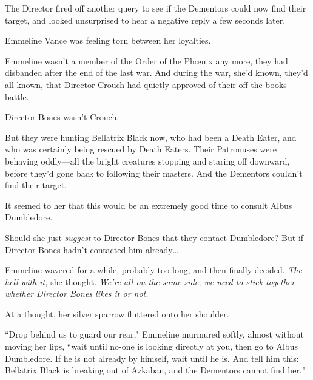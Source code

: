 The Director fired off another query to see if the Dementors could now find their target, and looked unsurprised to hear a negative reply a few seconds later.

Emmeline Vance was feeling torn between her loyalties.

Emmeline wasn't a member of the Order of the Phœnix any more, they had disbanded after the end of the last war. And during the war, she'd known, they'd all known, that Director Crouch had quietly approved of their off-the-books battle.

Director Bones wasn't Crouch.

But they were hunting Bellatrix Black now, who had been a Death Eater, and who was certainly being rescued by Death Eaters. Their Patronuses were behaving oddly—all the bright creatures stopping and staring off downward, before they'd gone back to following their masters. And the Dementors couldn't find their target.

It seemed to her that this would be an extremely good time to consult Albus Dumbledore.

Should she just \emph{suggest} to Director Bones that they contact Dumbledore? But if Director Bones hadn't contacted him already{\ldots}

Emmeline wavered for a while, probably too long, and then finally decided. \emph{The hell with it,} she thought. \emph{We're all on the same side, we need to stick together whether Director Bones likes it or not.}

At a thought, her silver sparrow fluttered onto her shoulder.

``Drop behind us to guard our rear," Emmeline murmured softly, almost without moving her lips, ``wait until no-one is looking directly at you, then go to Albus Dumbledore. If he is not already by himself, wait until he is. And tell him this: Bellatrix Black is breaking out of Azkaban, and the Dementors cannot find her."

